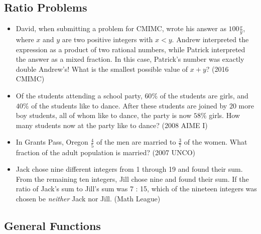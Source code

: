 \documentclass{article}
\begin{document}
\subsection{Ratio Problems}

\begin{itemize}

\item David, when submitting a problem for CMIMC, wrote his answer as $100\frac{x}{y}$, where $x$ and $y$ are two positive integers with $x<y$. Andrew interpreted the expression as a product of two rational numbers, while Patrick interpreted the answer as a mixed fraction. In this case, Patrick's number was exactly double Andrew's! What is the smallest possible value of $x+y$? (2016 CMIMC)

\item Of the students attending a school party, $60\%$ of the students are girls, and $40\%$ of the students like to dance. After these students are joined by $20$ more boy students, all of whom like to dance, the party is now $58\%$ girls. How many students now at the party like to dance? (2008 AIME I)

%
\item In Grants Pass, Oregon $\frac{4}{5}$ of the men are married to $\frac{3}{7}$ of the women. What fraction of the adult population is married? (2007 UNCO)

\item Jack chose nine different integers from 1 through 19 and found their sum. From the remaining ten integers, Jill chose nine and found their sum. If the ratio of Jack's sum to Jill's sum was 7 : 15, which of the nineteen integers was chosen be \emph{neither} Jack nor Jill. (Math League)

\end{itemize}


\subsection{General Functions}
\end{document}
